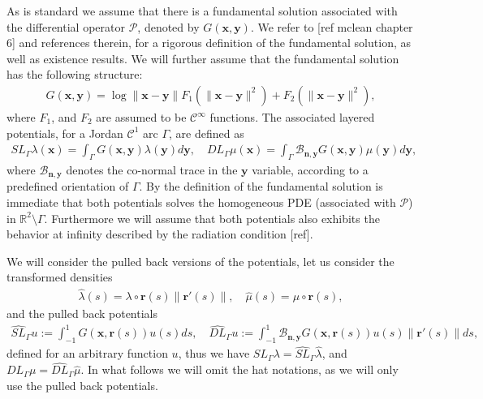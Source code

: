 \documentclass{article}
\newcommand{\vx}{\bm{x}}
\newcommand{\todo}[1]{{\color{red}[#1]}}
\newcommand{\IR}{{\mathbb R}}
\newcommand{\cP}{\mathcal{P}}
\newcommand{\bn}{\bm{n}}
\newcommand{\br}{\bm{r}}
\newcommand{\bx}{\bm{x}}
\newcommand{\by}{\bm{y}}
\begin{document}
As is standard we assume that there is a fundamental solution associated with the differential operator $\cP$, denoted by $G(\vx,\by)$. We refer to \todo{ref mclean chapter 6} and references therein, for a rigorous definition of the fundamental solution, as well as existence results. We will further assume that the fundamental solution has the following structure:
\begin{align}
\label{eq:funsolgen}
G(\bx,\by )  =
\log \|\bx -\by \| F_1(\|\bx -\by \| ^2)+F_2(\|\bx -\by \| ^2),
\end{align}
where $F_1$, and $F_2$ are assumed to be $\mathcal{C}^\infty$ functions. The associated layered potentials, for a Jordan $\mathcal{C}^1$ arc $\Gamma$, are defined as 
\begin{align*}
SL_\Gamma \lambda(\bx) = \int_\Gamma G(\bx,\by) \lambda(\by) d\by, \quad DL_\Gamma \mu(\bx) = \int_\Gamma \mathcal{B}_{\bn,\by} G(\bx,\by) \mu(\by) d\by,
\end{align*} 
where $\mathcal{B}_{\bn,\by}$ denotes the co-normal trace in the $\by$ variable, according to a predefined orientation of $\Gamma$. By the definition of the fundamental solution is immediate that both potentials solves the homogeneous PDE (associated with $\cP$) in $\IR^2 \setminus \Gamma$. Furthermore we will assume that both potentials also exhibits the behavior at infinity described by the radiation condition \todo{ref}. 

We will consider the pulled back versions of the potentials, let us consider the transformed densities 
\begin{align*}
\widehat{\lambda} (s) = \lambda \circ \br(s)  \| \br'(s) \|, \quad 
\widehat{\mu} (s) = \mu \circ \br(s),
\end{align*}
and the pulled back potentials 
\begin{align*}
\widehat{SL}_{\Gamma} u := \int_{-1}^1 
 G(\bx,\br(s))  u(s) ds, \quad 
 \widehat{DL}_{\Gamma} u := \int_{-1}^1 
 \mathcal{B}_{\bn,\by}G(\bx,\br(s))  u(s) \|\br'(s)\|ds,
\end{align*}
defined for an arbitrary function $u$, thus we have $SL_\Gamma \lambda  = \widehat{SL}_\Gamma \widehat{\lambda}$, and $DL_\Gamma \mu  = \widehat{DL}_\Gamma \widehat{\mu}$. In what follows we will omit the hat notations, as we will only use the pulled back potentials. 
\end{document}
